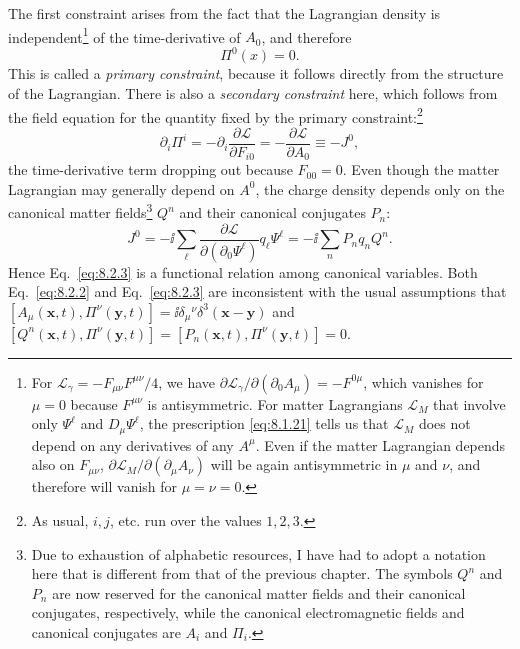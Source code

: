 The first constraint arises from the fact that the Lagrangian density is
independent\footnote{For $\mathcal L_\gamma=-F_{\mu\nu}F^{\mu\nu}/4$, we have
$\partial\mathcal L_\gamma/\partial(\partial_0A_\mu)=-F^{0\mu}$, which vanishes
for $\mu=0$ because $F^{\mu\nu}$ is antisymmetric. For matter Lagrangians
$\mathcal L_M$ that involve only $\Psi^\ell$ and $D_\mu\Psi^\ell$, the
prescription \eqref{eq:8.1.21} tells us that $\mathcal L_M$ does not depend on any
derivatives of any $A^\mu$. Even if the matter Lagrangian depends also on
$F_{\mu\nu}$, $\partial\mathcal L_M/\partial(\partial_\mu A_\nu)$ will be again
antisymmetric in $\mu$ and $\nu$, and therefore will vanish for $\mu=\nu=0$.}
of the time-derivative of $A_0$, and therefore
\begin{equation}
  \Pi^0(x)=0.
  \tag{8.2.2}\label{eq:8.2.2}
\end{equation}
This is called a \textit{primary constraint}, because it follows directly from
the structure of the Lagrangian. There is also a \textit{secondary constraint}
here, which follows from the field equation for the quantity fixed by the
primary constraint:\footnote{As usual, $i,j$, etc. run over the values $1,2,3$.}
\begin{equation}
  \partial_i\Pi^i=-\partial_i\frac{\partial\mathcal L}{\partial F_{i0}}
  =-\frac{\partial\mathcal L}{\partial A_0}\equiv-J^0,
  \tag{8.2.3}\label{eq:8.2.3}
\end{equation}
the time-derivative term dropping out because $F_{00}=0$. Even though
the matter Lagrangian may generally depend on $A^0$, the charge density
depends only on the canonical matter fields\footnote{Due to exhaustion of
alphabetic resources, I have had to adopt a notation here that is different
from that of the previous chapter. The symbols $Q^n$ and $P_n$ are now
reserved for the canonical matter fields and their canonical conjugates,
respectively, while the canonical electromagnetic fields and canonical
conjugates are $A_i$ and $\Pi_i$.} $Q^n$ and their canonical conjugates $P_n$:
\begin{equation}
  J^0=-\ii\sum_\ell
  \frac{\partial\mathcal L}{\partial(\partial_0\Psi^\ell)}q_\ell\Psi^\ell
  =-\ii\sum_n P_nq_nQ^n.
  \tag{8.2.4}\label{eq:8.2.4}
\end{equation}
Hence Eq.~\eqref{eq:8.2.3} is a functional relation among canonical variables.
Both Eq.~\eqref{eq:8.2.2} and Eq.~\eqref{eq:8.2.3} are inconsistent with the usual
assumptions that
$[A_\mu(\mathbf x,t),\Pi^\nu(\mathbf y,t)]
=\ii\delta_\mu{}^\nu\delta^3(\mathbf x-\mathbf y)$ and
$[Q^n(\mathbf x,t),\Pi^\nu(\mathbf y,t)]
=[P_n(\mathbf x,t),\Pi^\nu(\mathbf y,t)]=0$.

